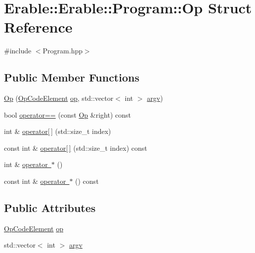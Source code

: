 \hypertarget{struct_erable_1_1_erable_1_1_program_1_1_op}{}\section{Erable\+::Erable\+::Program\+::Op Struct Reference}
\label{struct_erable_1_1_erable_1_1_program_1_1_op}


{\ttfamily \#include $<$Program.\+hpp$>$}

\subsection*{Public Member Functions}
\begin{DoxyCompactItemize}
\item 
\mbox{\hyperlink{struct_erable_1_1_erable_1_1_program_1_1_op_a7a9fae3ceee2da5fff7841237b1c142b}{Op}} (\mbox{\hyperlink{class_erable_1_1_op_code_element}{Op\+Code\+Element}} \mbox{\hyperlink{struct_erable_1_1_erable_1_1_program_1_1_op_ad908a223827b7846bc7a5a0b5b43c895}{op}}, std\+::vector$<$ int $>$ \mbox{\hyperlink{struct_erable_1_1_erable_1_1_program_1_1_op_af1ac14d0226ae757f635ea67d1c675d4}{argv}})
\item 
bool \mbox{\hyperlink{struct_erable_1_1_erable_1_1_program_1_1_op_a116ecfacf9007a658c243cfa2e47c8a7}{operator==}} (const \mbox{\hyperlink{struct_erable_1_1_erable_1_1_program_1_1_op}{Op}} \&right) const
\item 
int \& \mbox{\hyperlink{struct_erable_1_1_erable_1_1_program_1_1_op_ae357469f877e3d8fb438f2a1fe071c1f}{operator\mbox{[}$\,$\mbox{]}}} (std\+::size\+\_\+t index)
\item 
const int \& \mbox{\hyperlink{struct_erable_1_1_erable_1_1_program_1_1_op_a032b00f5b876e24a5b33c717ef23867f}{operator\mbox{[}$\,$\mbox{]}}} (std\+::size\+\_\+t index) const
\item 
int \& \mbox{\hyperlink{struct_erable_1_1_erable_1_1_program_1_1_op_a9c3a73f7dd366b448304ae652749af1c}{operator $\ast$}} ()
\item 
const int \& \mbox{\hyperlink{struct_erable_1_1_erable_1_1_program_1_1_op_a14c45ad05402aff4543fe7d50eaa07c7}{operator $\ast$}} () const
\end{DoxyCompactItemize}
\subsection*{Public Attributes}
\begin{DoxyCompactItemize}
\item 
\mbox{\hyperlink{class_erable_1_1_op_code_element}{Op\+Code\+Element}} \mbox{\hyperlink{struct_erable_1_1_erable_1_1_program_1_1_op_ad908a223827b7846bc7a5a0b5b43c895}{op}}
\item 
std\+::vector$<$ int $>$ \mbox{\hyperlink{struct_erable_1_1_erable_1_1_program_1_1_op_af1ac14d0226ae757f635ea67d1c675d4}{argv}}
\end{DoxyCompactItemize}
